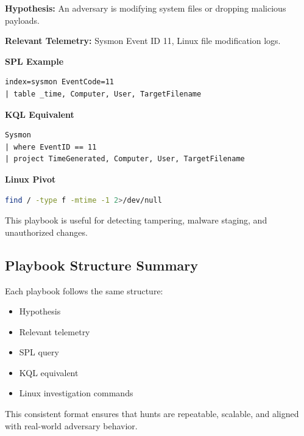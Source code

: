 \textbf{Hypothesis:}  
An adversary is modifying system files or dropping malicious payloads.

\textbf{Relevant Telemetry:}  
Sysmon Event ID 11, Linux file modification logs.

\textbf{SPL Example}

\begin{lstlisting}
index=sysmon EventCode=11
| table _time, Computer, User, TargetFilename
\end{lstlisting}

\textbf{KQL Equivalent}

\begin{lstlisting}
Sysmon
| where EventID == 11
| project TimeGenerated, Computer, User, TargetFilename
\end{lstlisting}

\textbf{Linux Pivot}

\begin{lstlisting}[language=bash]
find / -type f -mtime -1 2>/dev/null
\end{lstlisting}

This playbook is useful for detecting tampering, malware staging, and unauthorized changes.


\subsection*{Playbook Structure Summary}

Each playbook follows the same structure:

\begin{itemize}
    \item Hypothesis
    \item Relevant telemetry
    \item SPL query
    \item KQL equivalent
    \item Linux investigation commands
\end{itemize}

This consistent format ensures that hunts are repeatable, scalable, and aligned with real-world adversary behavior.
